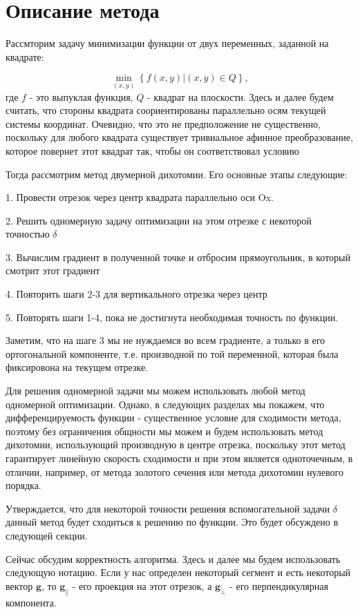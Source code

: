 \documentclass[12pt]{article}
\begin{document}
\tableofcontents
\newpage


\section{Описание метода}

Рассмторим задачу минимизации функции от двух переменных, заданной на квадрате:

$$\min_{(x,y)}\left\{f(x,y)|(x,y) \in Q\right\},$$
где $f$ - это выпуклая функция, $Q$ - квадрат на плоскости. Здесь и далее будем считать, что стороны квадрата соориентированы параллельно осям текущей системы координат. Очевидно, что это не предположение не существенно, поскольку для любого квадрата существует тривиальное афинное преобразование, которое повернет этот квадрат так, чтобы он соответствовал условию

Тогда рассмотрим метод двумерной дихотомии. Его основные этапы следующие:

1. Провести отрезок через центр квадрата параллельно оси Ox.

2. Решить одномерную задачу оптимизации на этом отрезке с некоторой точностью $\delta$

3. Вычислим градиент в полученной точке и отбросим прямоугольник, в который смотрит этот градиент

4. Повторить шаги 2-3 для вертикального отрезка через центр

5. Повторять шаги 1-4, пока не достигнута необходимая точность по функции.

Заметим, что на шаге 3 мы не нуждаемся во всем градиенте, а только в его ортогональной компоненте, т.е. производной по той переменной, которая была фиксировона на текущем отрезке.

Для решения одномерной задачи мы можем использовать любой метод одномерной оптимизации. Однако, в следующих разделах мы покажем, что дифференцируемость функции - существенное условие для сходимости метода, поэтому без ограничения общности мы можем и будем использовать метод дихотомии, использующий производную в центре отрезка, поскольку этот метод гарантирует линейную скорость сходимости и при этом является одноточечным, в отличии, например, от метода золотого сечения или метода дихотомии нулевого порядка.

Утверждается, что для некоторой точности решения вспомогательной задачи $\delta$ данный метод будет сходиться к решению по функции. Это будет обсуждено в следующей секции.

Сейчас обсудим корректность алгоритма. Здесь и далее мы будем использовать следующую нотацию. Если у нас определен некоторый сегмент и есть некоторый вектор $\textbf{g}$, то $\textbf{g}_\parallel$ - его проекция на этот отрезок, а $\textbf{g}_\perp$ - его перпендикулярная компонента.
\end{document}
